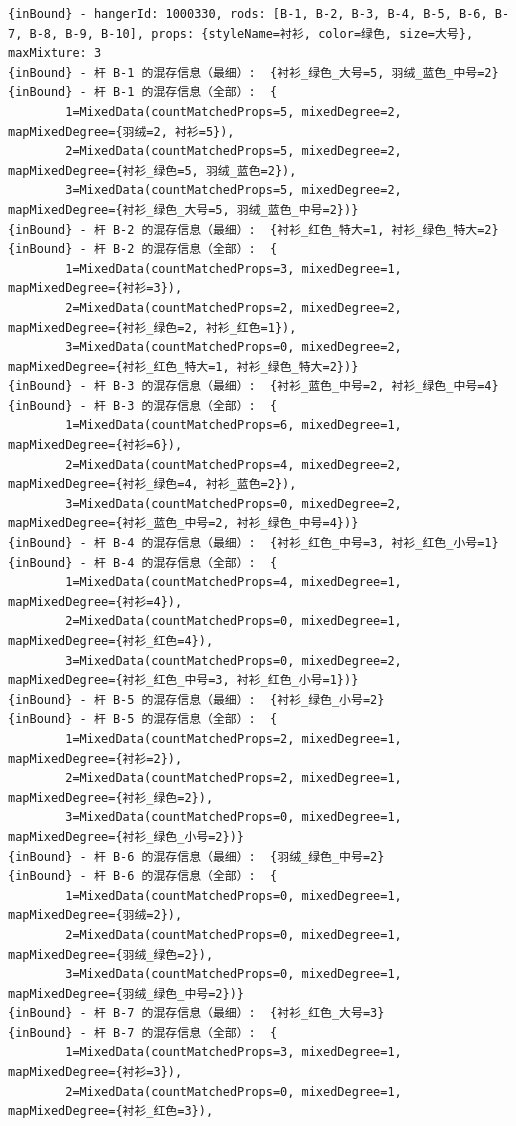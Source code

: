 {\begin{verbatim}
{inBound} - hangerId: 1000330, rods: [B-1, B-2, B-3, B-4, B-5, B-6, B-7, B-8, B-9, B-10], props: {styleName=衬衫, color=绿色, size=大号}, maxMixture: 3
{inBound} - 杆 B-1 的混存信息（最细）:  {衬衫_绿色_大号=5, 羽绒_蓝色_中号=2}
{inBound} - 杆 B-1 的混存信息（全部）:  {
		1=MixedData(countMatchedProps=5, mixedDegree=2, mapMixedDegree={羽绒=2, 衬衫=5}), 
		2=MixedData(countMatchedProps=5, mixedDegree=2, mapMixedDegree={衬衫_绿色=5, 羽绒_蓝色=2}), 
		3=MixedData(countMatchedProps=5, mixedDegree=2, mapMixedDegree={衬衫_绿色_大号=5, 羽绒_蓝色_中号=2})}
{inBound} - 杆 B-2 的混存信息（最细）:  {衬衫_红色_特大=1, 衬衫_绿色_特大=2}
{inBound} - 杆 B-2 的混存信息（全部）:  {
		1=MixedData(countMatchedProps=3, mixedDegree=1, mapMixedDegree={衬衫=3}), 
		2=MixedData(countMatchedProps=2, mixedDegree=2, mapMixedDegree={衬衫_绿色=2, 衬衫_红色=1}), 
		3=MixedData(countMatchedProps=0, mixedDegree=2, mapMixedDegree={衬衫_红色_特大=1, 衬衫_绿色_特大=2})}
{inBound} - 杆 B-3 的混存信息（最细）:  {衬衫_蓝色_中号=2, 衬衫_绿色_中号=4}
{inBound} - 杆 B-3 的混存信息（全部）:  {
		1=MixedData(countMatchedProps=6, mixedDegree=1, mapMixedDegree={衬衫=6}), 
		2=MixedData(countMatchedProps=4, mixedDegree=2, mapMixedDegree={衬衫_绿色=4, 衬衫_蓝色=2}), 
		3=MixedData(countMatchedProps=0, mixedDegree=2, mapMixedDegree={衬衫_蓝色_中号=2, 衬衫_绿色_中号=4})}
{inBound} - 杆 B-4 的混存信息（最细）:  {衬衫_红色_中号=3, 衬衫_红色_小号=1}
{inBound} - 杆 B-4 的混存信息（全部）:  {
		1=MixedData(countMatchedProps=4, mixedDegree=1, mapMixedDegree={衬衫=4}), 
		2=MixedData(countMatchedProps=0, mixedDegree=1, mapMixedDegree={衬衫_红色=4}), 
		3=MixedData(countMatchedProps=0, mixedDegree=2, mapMixedDegree={衬衫_红色_中号=3, 衬衫_红色_小号=1})}
{inBound} - 杆 B-5 的混存信息（最细）:  {衬衫_绿色_小号=2}
{inBound} - 杆 B-5 的混存信息（全部）:  {
		1=MixedData(countMatchedProps=2, mixedDegree=1, mapMixedDegree={衬衫=2}), 
		2=MixedData(countMatchedProps=2, mixedDegree=1, mapMixedDegree={衬衫_绿色=2}), 
		3=MixedData(countMatchedProps=0, mixedDegree=1, mapMixedDegree={衬衫_绿色_小号=2})}
{inBound} - 杆 B-6 的混存信息（最细）:  {羽绒_绿色_中号=2}
{inBound} - 杆 B-6 的混存信息（全部）:  {
		1=MixedData(countMatchedProps=0, mixedDegree=1, mapMixedDegree={羽绒=2}), 
		2=MixedData(countMatchedProps=0, mixedDegree=1, mapMixedDegree={羽绒_绿色=2}), 
		3=MixedData(countMatchedProps=0, mixedDegree=1, mapMixedDegree={羽绒_绿色_中号=2})}
{inBound} - 杆 B-7 的混存信息（最细）:  {衬衫_红色_大号=3}
{inBound} - 杆 B-7 的混存信息（全部）:  {
		1=MixedData(countMatchedProps=3, mixedDegree=1, mapMixedDegree={衬衫=3}), 
		2=MixedData(countMatchedProps=0, mixedDegree=1, mapMixedDegree={衬衫_红色=3}), 

\end{verbatim}}
